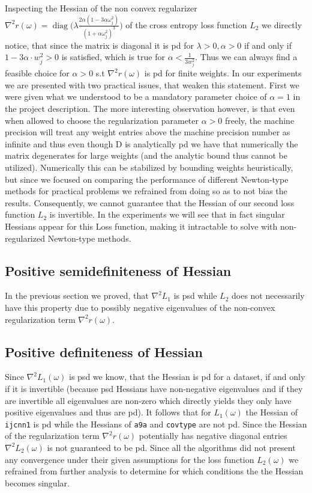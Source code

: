 \documentclass{article}
\begin{document}
Inspecting the Hessian of the non convex regularizer $\nabla ^2 r(\omega) = \operatorname{diag}\Big(\lambda \frac{2\alpha (1 - 3\alpha \omega_j^2)}{(1 + \alpha \omega_j^2)^3}\Big)$
of the cross entropy loss function $L_2$ we directly notice, that since the matrix is diagonal it is pd for $\lambda > 0, \alpha > 0$ if and only if $1-3\alpha\cdot w_j^2>0 $ is satisfied, which is true for $\alpha < \frac{1}{3w_j ^2}$. Thus we can always find a feasible choice for $\alpha>0$ s.t $\nabla ^2 r(\omega)$ is pd for finite weights. 
In our experiments we are presented with two practical issues, that weaken this statement. First we were given what we understood to be a mandatory parameter choice of  $\alpha = 1$ in the project description. The more interesting observation however, is that even when allowed to choose the regularization parameter $\alpha>0$ freely, the machine precision will treat any weight entries above the machine precision number as infinite and thus even though D is analytically pd we have that numerically the matrix degenerates for large weights (and the analytic bound thus cannot be utilized). Numerically this can be stabilized by bounding weights heuristically, but since we focused on comparing the performance of different Newton-type methods for practical problems we refrained from doing so as to not bias the results. Consequently, we cannot guarantee that the Hessian of our second loss function $L_2$ is invertible. In the experiments we will see that in fact singular Hessians appear for this Loss function, making it intractable to solve with non-regularized Newton-type methods.
\subsection{Positive semidefiniteness of Hessian}
In the previous section we proved, that $\nabla ^2 L_1$ is psd while $L_2$ does not necessarily have this property due to possibly negative eigenvalues of the non-convex regularization term $\nabla ^2 r(\omega)$.

\subsection{Positive definiteness of Hessian}
Since $\nabla^2 L_1(\omega)$ is psd we know, that the Hessian is pd for a dataset, if and only if it is invertible (because psd Hessians have non-negative eigenvalues and if they are invertible all eigenvalues are non-zero which directly yields they only have positive eigenvalues and thus are pd). It follows that for $L_1(\omega)$ the Hessian of \texttt{ijcnn1} is pd while the Hessians of \texttt{a9a} and \texttt{covtype} are not pd. Since the Hessian of the regularization term $\nabla ^2 r(\omega)$ potentially has negative diagonal entries $\nabla^2 L_2(\omega)$ is not guaranteed to be pd. Since all the algorithms did not present any convergence under their given assumptions for the loss function $L_2(\omega)$ we refrained from further analysis to determine for which conditions the the Hessian becomes singular.
\end{document}
